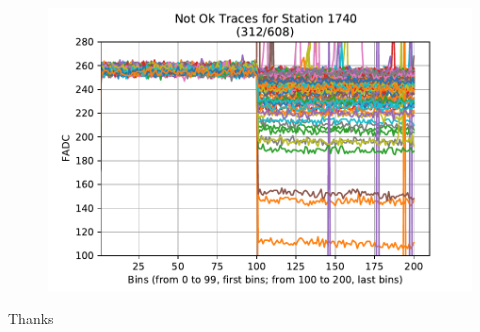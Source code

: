 \documentclass[aspectratio=169]{beamer}
\begin{document}
\begin{frame}
  \begin{figure}[h]
    \centering
    \includegraphics[width=.85\textwidth]{..//plots/tracesFirstLast1740zoom.pdf}
    \end{figure}
\end{frame}


\begin{frame}
  \centering
  Thanks
\end{frame}
\end{document}

